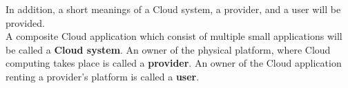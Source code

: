 In addition, a short meanings of a Cloud system, a provider, and a user will be provided.\\
A composite Cloud application which consist of multiple small applications will be called a \textbf{Cloud system}\label{def:csys}. %
An owner of the physical platform, where Cloud computing takes place is called a \textbf{provider}.
An owner of the Cloud application renting a provider's platform is called a \textbf{user}.
\clearpage
